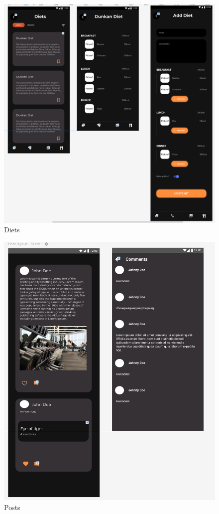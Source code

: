 \documentclass[12pt,a4paper]{article}
\begin{document}
\begin{figure}[h]
  \centering
 \includegraphics[width=1\textwidth]{diets}
 \caption{Diets}
\end{figure}


\begin{figure}[h]
  \centering
 \includegraphics[width=1\textwidth]{post}
 \caption{Posts}
\end{figure}
\end{document}
